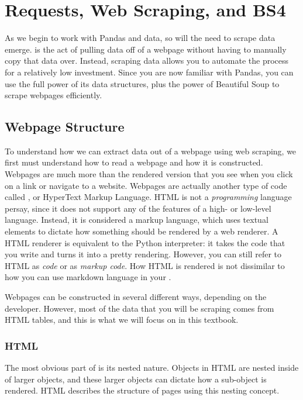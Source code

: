 \chapter{Requests, Web Scraping, and BS4}
As we begin to work with Pandas and data, so will the need to scrape data emerge.  is the act of pulling data off of a webpage without having to manually copy that data over. Instead, scraping data allows you to automate the process for a relatively low investment. Since you are now familiar with Pandas, you can use the full power of its data structures, plus the power of Beautiful Soup to scrape webpages efficiently.\par

\section{Webpage Structure}
To understand how we can extract data out of a webpage using web scraping, we first must understand how to read a webpage and how it is constructed. Webpages are much more than the rendered version that you see when you click on a link or navigate to a website. Webpages are actually another type of code called , or HyperText Markup Language. HTML is not a \textit{programming} language persay, since it does not support any of the features of a high- or low-level language. Instead, it is considered a markup language, which uses textual elements to dictate how something should be rendered by a web renderer. A HTML renderer is equivalent to the Python interpreter: it takes the code that you write and turns it into a pretty rendering. However, you can still refer to HTML as \textit{code} or as \textit{markup code}. How HTML is rendered is not dissimilar to how you can use markdown language in your .\par
Webpages can be constructed in several different ways, depending on the developer. However, most of the data that you will be scraping comes from HTML tables, and this is what we will focus on in this textbook.\par

\subsection{HTML}
The most obvious part of  is its nested nature. Objects in HTML are nested inside of larger objects, and these larger objects can dictate how a sub-object is rendered. HTML describes the structure of pages using this nesting concept.

